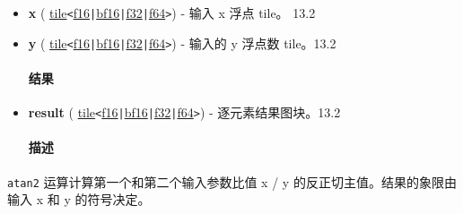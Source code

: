 \documentclass{article}
\begin{document}
\begin{itemize}
\item \textbf{x} ( \href{https://docs.nvidia.com/cuda/tile-ir/latest/sections/types.html#type-tile}{tile}\texttt{<}\href{https://docs.nvidia.com/cuda/tile-ir/latest/sections/types.html#subsection-element-types}{f16}\texttt{|}\href{https://docs.nvidia.com/cuda/tile-ir/latest/sections/types.html#subsection-element-types}{bf16}\texttt{|}\href{https://docs.nvidia.com/cuda/tile-ir/latest/sections/types.html#subsection-element-types}{f32}\texttt{|}\href{https://docs.nvidia.com/cuda/tile-ir/latest/sections/types.html#subsection-element-types}{f64}\texttt{>}) - 输入 x 浮点 tile。 13.2
\item \textbf{y} ( \href{https://docs.nvidia.com/cuda/tile-ir/latest/sections/types.html#type-tile}{tile}\texttt{<}\href{https://docs.nvidia.com/cuda/tile-ir/latest/sections/types.html#subsection-element-types}{f16}\texttt{|}\href{https://docs.nvidia.com/cuda/tile-ir/latest/sections/types.html#subsection-element-types}{bf16}\texttt{|}\href{https://docs.nvidia.com/cuda/tile-ir/latest/sections/types.html#subsection-element-types}{f32}\texttt{|}\href{https://docs.nvidia.com/cuda/tile-ir/latest/sections/types.html#subsection-element-types}{f64}\texttt{>}) - 输入的 y 浮点数 tile。13.2




\paragraph{结果}


\item \textbf{result} ( \href{https://docs.nvidia.com/cuda/tile-ir/latest/sections/types.html#type-tile}{tile}\texttt{<}\href{https://docs.nvidia.com/cuda/tile-ir/latest/sections/types.html#subsection-element-types}{f16}\texttt{|}\href{https://docs.nvidia.com/cuda/tile-ir/latest/sections/types.html#subsection-element-types}{bf16}\texttt{|}\href{https://docs.nvidia.com/cuda/tile-ir/latest/sections/types.html#subsection-element-types}{f32}\texttt{|}\href{https://docs.nvidia.com/cuda/tile-ir/latest/sections/types.html#subsection-element-types}{f64}\texttt{>}) - 逐元素结果图块。13.2




\paragraph{描述}


\end{itemize}
\texttt{atan2} 运算计算第一个和第二个输入参数比值 x / y 的反正切主值。结果的象限由输入 x 和 y 的符号决定。
\end{document}
